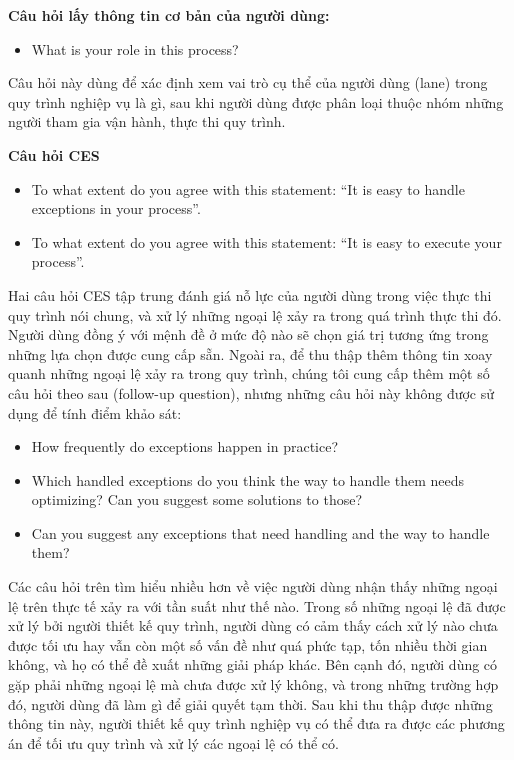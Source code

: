 \textbf{Câu hỏi lấy thông tin cơ bản của người dùng:}
\begin{itemize}
    \item What is your role in this process?
\end{itemize}
\par
Câu hỏi này dùng để xác định xem vai trò cụ thể của người dùng (lane) trong quy trình nghiệp vụ là gì, sau khi người dùng được phân loại thuộc nhóm những người tham gia vận hành, thực thi quy trình.

\textbf{Câu hỏi CES}
\begin{itemize}
    \item To what extent do you agree with this statement: “It is easy to handle exceptions in your process”.
    \item To what extent do you agree with this statement: “It is easy to execute your process”.
\end{itemize}
\par
Hai câu hỏi CES tập trung đánh giá nỗ lực của người dùng trong việc thực thi quy trình nói chung, và xử lý những ngoại lệ xảy ra trong quá trình thực thi đó. Người dùng đồng ý với mệnh đề ở mức độ nào sẽ chọn giá trị tương ứng trong những lựa chọn được cung cấp sẵn.
Ngoài ra, để thu thập thêm thông tin xoay quanh những ngoại lệ xảy ra trong quy trình, chúng tôi cung cấp thêm một số câu hỏi theo sau (follow-up question), nhưng những câu hỏi này không được sử dụng để tính điểm khảo sát:
\begin{itemize}
    \item How frequently do exceptions happen in practice?
    \item Which handled exceptions do you think the way to handle them needs optimizing? Can you suggest some solutions to those?
    \item Can you suggest any exceptions that need handling and the way to handle them?
\end{itemize}
\par
Các câu hỏi trên tìm hiểu nhiều hơn về việc người dùng nhận thấy những ngoại lệ trên thực tế xảy ra với tần suất như thế nào. Trong số những ngoại lệ đã được xử lý bởi người thiết kế quy trình, người dùng có cảm thấy cách xử lý nào chưa được tối ưu hay vẫn còn một số vấn đề như quá phức tạp, tốn nhiều thời gian không, và họ có thể đề xuất những giải pháp khác. Bên cạnh đó, người dùng có gặp phải những ngoại lệ mà chưa được xử lý không, và trong những trường hợp đó, người dùng đã làm gì để giải quyết tạm thời. Sau khi thu thập được những thông tin này, người thiết kế quy trình nghiệp vụ có thể đưa ra được các phương án để tối ưu quy trình và xử lý các ngoại lệ có thể có.

